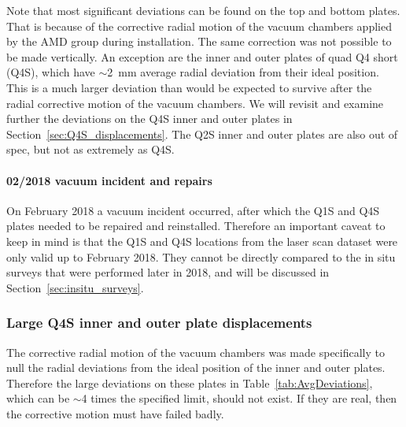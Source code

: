 
Note that most significant deviations can be found on the top and bottom plates. That is because of the corrective radial motion of the vacuum chambers applied by the AMD group during installation. 
The same correction was not possible to be made vertically.
An exception are the inner and outer plates of quad Q4 short (Q4S), which have $\sim$\SI{2}{mm} average radial deviation from their ideal position. This is a much larger deviation than would be expected to survive after the radial corrective motion of the vacuum chambers.
We will revisit and examine further the deviations on the Q4S inner and outer plates in Section~\ref{sec:Q4S_displacements}.
The Q2S inner and outer plates are also out of spec, but not as extremely as Q4S.




\paragraph{\label{sec:VacuumIncident} 02/2018 vacuum incident and repairs}

On February 2018 a vacuum incident occurred, after which the Q1S and Q4S plates needed to be repaired and reinstalled.
Therefore an important caveat to keep in mind is that the Q1S and Q4S locations from the laser scan dataset were only valid up to February 2018. 
They cannot be directly compared to the in situ surveys that were performed later in 2018, and will be discussed in Section~\ref{sec:insitu_surveys}.




\subsubsection{\label{sec:Q4S_displacements} Large Q4S inner and outer plate displacements}

The corrective radial motion of the vacuum chambers was made specifically to null the radial deviations from the ideal position of the inner and outer plates. 
Therefore the large deviations on these plates in Table~\ref{tab:AvgDeviations}, which can be $\sim$4 times the specified limit, should not exist. If they are real, then the corrective motion must have failed badly.

